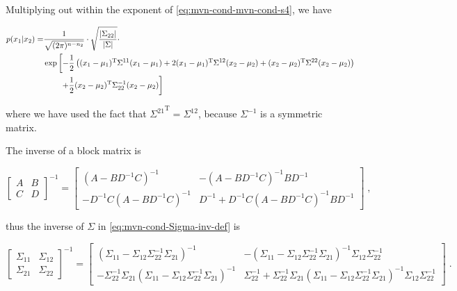 \documentclass[a4paper,12pt,twoside]{book}
\begin{document}
Multiplying out within the exponent of \eqref{eq:mvn-cond-mvn-cond-s4}, we have

\begin{equation} \label{eq:mvn-cond-mvn-cond-s5}
\begin{split}
p(x_1|x_2) = &\frac{1}{\sqrt{(2 \pi)^{n-n_2}}} \cdot \sqrt{\frac{|\Sigma_{22}|}{|\Sigma|}} \cdot \\
&\exp \left[ -\frac{1}{2} \left( (x_1-\mu_1)^\mathrm{T} \Sigma^{11} (x_1-\mu_1) + 2 (x_1-\mu_1)^\mathrm{T} \Sigma^{12} (x_2-\mu_2) + (x_2-\mu_2)^\mathrm{T} \Sigma^{22} (x_2-\mu_2) \right) \right. \\
&\hphantom{\exp \left[\right.} \left. + \frac{1}{2} (x_2-\mu_2)^\mathrm{T} \Sigma_{22}^{-1} (x_2-\mu_2) \right]
\end{split}
\end{equation}

where we have used the fact that ${\Sigma^{21}}^\mathrm{T} = \Sigma^{12}$, because $\Sigma^{-1}$ is a symmetric matrix.

\vspace{1em}
The inverse of a block matrix is

\begin{equation} \label{eq:mvn-cond-Block-inv}
\begin{bmatrix} A & B \\ C & D \end{bmatrix}^{-1} = \begin{bmatrix} (A-BD^{-1}C)^{-1} & -(A-BD^{-1}C)^{-1}BD^{-1} \\ -D^{-1}C(A-BD^{-1}C)^{-1} & D^{-1}+D^{-1}C(A-BD^{-1}C)^{-1}BD^{-1} \end{bmatrix} \; ,
\end{equation}

thus the inverse of $\Sigma$ in \eqref{eq:mvn-cond-Sigma-inv-def} is

\begin{equation} \label{eq:mvn-cond-Sigma-inv}
\begin{bmatrix} \Sigma_{11} & \Sigma_{12} \\ \Sigma_{21} & \Sigma_{22} \end{bmatrix}^{-1} = \begin{bmatrix} (\Sigma_{11} - \Sigma_{12} \Sigma_{22}^{-1} \Sigma_{21})^{-1} & -(\Sigma_{11} - \Sigma_{12} \Sigma_{22}^{-1} \Sigma_{21})^{-1} \Sigma_{12} \Sigma_{22}^{-1} \\ -\Sigma_{22}^{-1} \Sigma_{21} (\Sigma_{11} - \Sigma_{12} \Sigma_{22}^{-1} \Sigma_{21})^{-1} & \Sigma_{22}^{-1} + \Sigma_{22}^{-1} \Sigma_{21} (\Sigma_{11} - \Sigma_{12} \Sigma_{22}^{-1} \Sigma_{21})^{-1} \Sigma_{12} \Sigma_{22}^{-1} \end{bmatrix} \; .
\end{equation}
\end{document}
